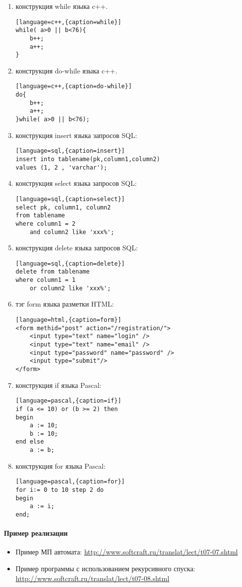 \documentclass[a4paper,12pt]{article}
\begin{document}
\begin{enumerate}
\item конструкция while языка c++. 
\begin{lstlisting}[language=c++,{caption=while}]
while( a>0 || b<76){
	b++;
	a++;
}
\end{lstlisting}

\item конструкция do-while языка c++. 
\begin{lstlisting}[language=c++,{caption=do-while}]
do{
	b++;
	a++;
}while( a>0 || b<76);
\end{lstlisting}

	\item конструкция insert языка запросов SQL:
\begin{lstlisting}[language=sql,{caption=insert}]
insert into tablename(pk,column1,column2) 
values (1, 2 , 'varchar');
\end{lstlisting}

	\item конструкция select языка запросов SQL:
\begin{lstlisting}[language=sql,{caption=select}]
select pk, column1, column2
from tablename
where column1 = 2 
	and column2 like 'xxx%';
\end{lstlisting}

	\item конструкция delete языка запросов SQL:
\begin{lstlisting}[language=sql,{caption=delete}]
delete from tablename
where column1 = 1
	or column2 like 'xxx%';
\end{lstlisting}

	\item тэг form языка разметки HTML: 
\begin{lstlisting}[language=html,{caption=form}]
<form methid="post" action="/registration/">
	<input type="text" name="login" />
	<input type="text" name="email" />
	<input type="password" name="password" />
	<input type="submit"/>
</form>
\end{lstlisting}

	\item конструкция if языка Pascal: 
\begin{lstlisting}[language=pascal,{caption=if}]
if (a <= 10) or (b >= 2) then
begin
	a := 10;
	b := 10;
end else
	a := b;

\end{lstlisting}

	\item конструкция for языка Pascal: 
\begin{lstlisting}[language=pascal,{caption=for}]
for i:= 0 to 10 step 2 do 
begin
	a := i;
end;
\end{lstlisting}

\end{enumerate}

\paragraph{Пример реализации}
\begin{itemize}
	\item Пример МП автомата: \url{http://www.softcraft.ru/translat/lect/t07-07.shtml}
	\item Пример программы с использованием рекурсивного спуска: \url{http://www.softcraft.ru/translat/lect/t07-08.shtml}
\end{itemize}
\end{document}
